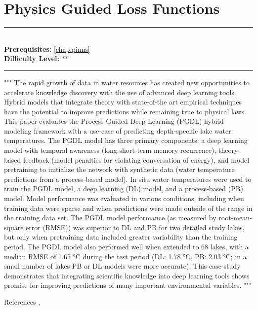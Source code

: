 \documentclass[book.tex]{subfiles}
\begin{document}
\chapter{Physics Guided Loss Functions}
\label{chap:phys_loss}
\noindent\rule{11cm}{0.4pt} \\
\textbf{Prerequisites:}  \autoref{chap:pinns} \\
\textbf{Difficulty Level:} ** \\
\noindent\rule{11cm}{0.4pt}
\vspace{5mm}

"""
The rapid growth of data in water resources has created new opportunities to accelerate
knowledge discovery with the use of advanced deep learning tools. Hybrid models that integrate theory
with state‐of‐the art empirical techniques have the potential to improve predictions while remaining true to
physical laws. This paper evaluates the Process‐Guided Deep Learning (PGDL) hybrid modeling
framework with a use‐case of predicting depth‐specific lake water temperatures. The PGDL model has three
primary components: a deep learning model with temporal awareness (long short‐term memory
recurrence), theory‐based feedback (model penalties for violating conversation of energy), and model
pretraining to initialize the network with synthetic data (water temperature predictions from a
process‐based model). In situ water temperatures were used to train the PGDL model, a deep learning (DL)
model, and a process‐based (PB) model. Model performance was evaluated in various conditions, including
when training data were sparse and when predictions were made outside of the range in the training
data set. The PGDL model performance (as measured by root‐mean‐square error (RMSE)) was superior to
DL and PB for two detailed study lakes, but only when pretraining data included greater variability than
the training period. The PGDL model also performed well when extended to 68 lakes, with a median RMSE
of 1.65 °C during the test period (DL: 1.78 °C, PB: 2.03 °C; in a small number of lakes PB or DL models
were more accurate). This case‐study demonstrates that integrating scientific knowledge into deep learning
tools shows promise for improving predictions of many important environmental variables.
"""

References \cite{willard2020integrating}, \cite{read2019process}
\end{document}
